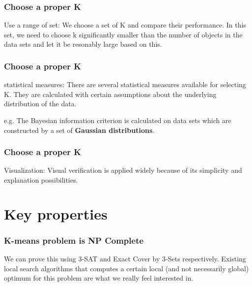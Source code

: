 \documentclass[9pt]{beamer}
\newcommand{\ccp}[1]{{\color{purple}#1}}
\begin{document}
\begin{frame}
	\frametitle{Choose a proper K}
	\ccp{Use a range of set}: We choose a set of K and compare their performance. In this set, we need to choose k \ccp{significantly smaller than the number of objects in the data sets and let it be resonably large based on this}.\par


\end{frame}

\begin{frame}
	\frametitle{Choose a proper K}
	\ccp{statistical measures}: There are several statistical measures available for selecting K. \ccp{They are calculated with certain assumptions about the underlying distribution of the data.} \par
	e.g. The Bayesian information criterion is calculated on data sets which are constructed by a set of \textbf{Gaussian distributions}. \par
\end{frame}

\begin{frame}
	\frametitle{Choose a proper K}
	\ccp{Visualization}: Visual verification is applied widely because of its simplicity and explanation possibilities.

\end{frame}

\section{Key properties}
\begin{frame}
	\frametitle{K-means problem is NP Complete}
We can prove this using 3-SAT and Exact Cover by 3-Sets respectively. Existing local search algorithms that computes a certain local (and not necessarily global) optimum for this problem are what we really feel interested in.\par
\end{frame}
\end{document}
